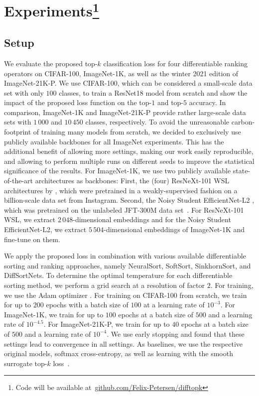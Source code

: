 \documentclass{article}
\begin{document}
\section{Experiments\protect\footnote{Code will be available at~\href{https://github.com/Felix-Petersen/difftopk}{github.com/Felix-Petersen/difftopk}}}


\subsection{Setup}
We evaluate the proposed top-$k$ classification loss for four differentiable ranking operators on CIFAR-100, ImageNet-1K, as well as the winter 2021 edition of ImageNet-21K-P.
We use CIFAR-100, which can be considered a small-scale data set with only $100$ classes, to train a ResNet18 model \citep{he2016deep_resnet} from scratch and show the impact of the proposed loss function on the top-$1$ and top-$5$ accuracy.
In comparison, ImageNet-1K and ImageNet-21K-P provide rather large-scale data sets with $1\,000$ and $10\,450$ classes, respectively.
To avoid the unreasonable carbon-footprint of training many models from scratch, we decided to exclusively use publicly available backbones for all ImageNet experiments.
This has the additional benefit of allowing more settings, making our work easily reproducible, and allowing to perform multiple runs on different seeds to improve the statistical significance of the results.
For ImageNet-1K, we use two publicly available state-of-the-art architectures as backbones: 
First, the (four) ResNeXt-101 WSL architectures by \citet{mahajan2018exploring}, which were pretrained in a weakly-supervised fashion on a billion-scale data set from Instagram.
Second, the Noisy Student EfficientNet-L2 \citep{xie2020self}, which was pretrained on the unlabeled JFT-300M data set~\citep{sun2017revisiting}.
For ResNeXt-101 WSL, we extract $2\,048$-dimensional embeddings and for the Noisy Student EfficientNet-L2, we extract $5\,504$-dimensional embeddings of ImageNet-1K and fine-tune on them.

We apply the proposed loss in combination with various available differentiable sorting and ranking approaches, namely NeuralSort, SoftSort, SinkhornSort, and DiffSortNets. 
To determine the optimal temperature for each differentiable sorting method, we perform a grid search at a resolution of factor $2$. 
For training, we use the Adam optimizer \citep{Kingma2014AdamOpt}.
For training on CIFAR-100 from scratch, we train for up to $200$ epochs with a batch size of $100$ at a learning rate of $10^{-3}$.
For ImageNet-1K, we train for up to $100$ epochs at a batch size of $500$ and a learning rate of $10^{-4.5}$.
For ImageNet-21K-P, we train for up to $40$ epochs at a batch size of $500$ and a learning rate of $10^{-4}$.
We use early stopping and found that these settings lead to convergence in all settings.
As baselines, we use the respective original models, softmax cross-entropy, as well as learning with the smooth surrogate top-$k$ loss~\citep{berrada2018smooth}.
\end{document}
